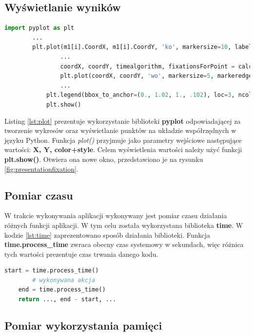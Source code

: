 \subsection{Wyświetlanie wyników}
\label{ssec:datashow}
\begin{lstlisting}[language=Python, caption=Wyświetlanie wyników, label={lst:plot}]
        import pyplot as plt
        ...
        plt.plot(m1[i].CoordX, m1[i].CoordY, 'ko', markersize=10, label='Eye-tracker points' if i == 0 else "")
                ...
                coordX, coordY, timealgorithm, fixationsForPoint = calculateIdtAlgorithm(m1)
                plt.plot(coordX, coordY, 'wo', markersize=5, markeredgecolor='r', label='Calculated fixations')
                ...
            plt.legend(bbox_to_anchor=(0., 1.02, 1., .102), loc=3, ncol=2, mode="expand", borderaxespad=0.)
            plt.show()
\end{lstlisting}
Listing \ref{lst:plot} prezentuje wykorzystanie biblioteki \textbf{pyplot} odpowiadającej za tworzenie wykresów oraz wyświetlanie punktów na układzie współrzędnych w języku Python. Funkcja \emph{plot()} przyjmuje jako parametry wejściowe następujące wartości: \textbf{X, Y, color+style}. Celem wyświetlenia wartości należy użyć funkcji \textbf{plt.show()}. Otwiera ona nowe okno, przedstawiono je na rysunku \ref{fig:presentationfixation}.
\subsection{Pomiar czasu}
\label{ssec:timemethod}
W trakcie wykonywania aplikacji wykonywany jest pomiar czasu działania różnych funkcji aplikacji. W tym celu została wykorzystana biblioteka \textbf{time}. W kodzie \ref{lst:time} zaprezentowano sposób działania biblioteki. Funkcja \textbf{time.process\_time} zwraca obecny czas systemowy w sekundach, więc różnica tych wartości prezentuje czas trwania danego kodu.
\begin{lstlisting}[language=Python, caption=Pomiar czasu, label={lst:time}]
    start = time.process_time()
        # wykonywana akcja
    end = time.process_time()
    return ..., end - start, ...
\end{lstlisting}
\subsection{Pomiar wykorzystania pamięci}
\label{ssec:memorymethod}
